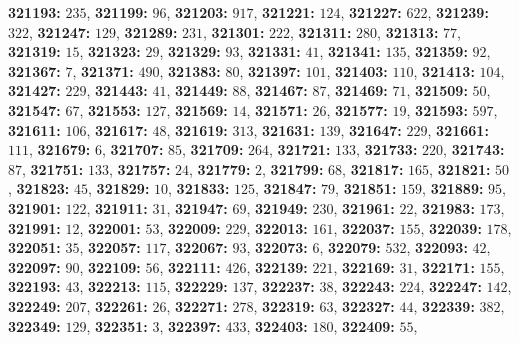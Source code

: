 \textsf{\bfseries 321193:} $235$, \textsf{\bfseries 321199:} $96$, \textsf{\bfseries 321203:} $917$, \textsf{\bfseries 321221:} $124$, \textsf{\bfseries 321227:} $622$, \textsf{\bfseries 321239:} $322$, \textsf{\bfseries 321247:} $129$, \textsf{\bfseries 321289:} $231$, \textsf{\bfseries 321301:} $222$, \textsf{\bfseries 321311:} $280$, \textsf{\bfseries 321313:} $77$, \textsf{\bfseries 321319:} $15$, \textsf{\bfseries 321323:} $29$, \textsf{\bfseries 321329:} $93$, \textsf{\bfseries 321331:} $41$, \textsf{\bfseries 321341:} $135$, \textsf{\bfseries 321359:} $92$, \textsf{\bfseries 321367:} $7$, \textsf{\bfseries 321371:} $490$, \textsf{\bfseries 321383:} $80$, \textsf{\bfseries 321397:} $101$, \textsf{\bfseries 321403:} $110$, \textsf{\bfseries 321413:} $104$, \textsf{\bfseries 321427:} $229$, \textsf{\bfseries 321443:} $41$, \textsf{\bfseries 321449:} $88$, \textsf{\bfseries 321467:} $87$, \textsf{\bfseries 321469:} $71$, \textsf{\bfseries 321509:} $50$, \textsf{\bfseries 321547:} $67$, \textsf{\bfseries 321553:} $127$, \textsf{\bfseries 321569:} $14$, \textsf{\bfseries 321571:} $26$, \textsf{\bfseries 321577:} $19$, \textsf{\bfseries 321593:} $597$, \textsf{\bfseries 321611:} $106$, \textsf{\bfseries 321617:} $48$, \textsf{\bfseries 321619:} $313$, \textsf{\bfseries 321631:} $139$, \textsf{\bfseries 321647:} $229$, \textsf{\bfseries 321661:} $111$, \textsf{\bfseries 321679:} $6$, \textsf{\bfseries 321707:} $85$, \textsf{\bfseries 321709:} $264$, \textsf{\bfseries 321721:} $133$, \textsf{\bfseries 321733:} $220$, \textsf{\bfseries 321743:} $87$, \textsf{\bfseries 321751:} $133$, \textsf{\bfseries 321757:} $24$, \textsf{\bfseries 321779:} $2$, \textsf{\bfseries 321799:} $68$, \textsf{\bfseries 321817:} $165$, \textsf{\bfseries 321821:} $50$, \textsf{\bfseries 321823:} $45$, \textsf{\bfseries 321829:} $10$, \textsf{\bfseries 321833:} $125$, \textsf{\bfseries 321847:} $79$, \textsf{\bfseries 321851:} $159$, \textsf{\bfseries 321889:} $95$, \textsf{\bfseries 321901:} $122$, \textsf{\bfseries 321911:} $31$, \textsf{\bfseries 321947:} $69$, \textsf{\bfseries 321949:} $230$, \textsf{\bfseries 321961:} $22$, \textsf{\bfseries 321983:} $173$, \textsf{\bfseries 321991:} $12$, \textsf{\bfseries 322001:} $53$, \textsf{\bfseries 322009:} $229$, \textsf{\bfseries 322013:} $161$, \textsf{\bfseries 322037:} $155$, \textsf{\bfseries 322039:} $178$, \textsf{\bfseries 322051:} $35$, \textsf{\bfseries 322057:} $117$, \textsf{\bfseries 322067:} $93$, \textsf{\bfseries 322073:} $6$, \textsf{\bfseries 322079:} $532$, \textsf{\bfseries 322093:} $42$, \textsf{\bfseries 322097:} $90$, \textsf{\bfseries 322109:} $56$, \textsf{\bfseries 322111:} $426$, \textsf{\bfseries 322139:} $221$, \textsf{\bfseries 322169:} $31$, \textsf{\bfseries 322171:} $155$, \textsf{\bfseries 322193:} $43$, \textsf{\bfseries 322213:} $115$, \textsf{\bfseries 322229:} $137$, \textsf{\bfseries 322237:} $38$, \textsf{\bfseries 322243:} $224$, \textsf{\bfseries 322247:} $142$, \textsf{\bfseries 322249:} $207$, \textsf{\bfseries 322261:} $26$, \textsf{\bfseries 322271:} $278$, \textsf{\bfseries 322319:} $63$, \textsf{\bfseries 322327:} $44$, \textsf{\bfseries 322339:} $382$, \textsf{\bfseries 322349:} $129$, \textsf{\bfseries 322351:} $3$, \textsf{\bfseries 322397:} $433$, \textsf{\bfseries 322403:} $180$, \textsf{\bfseries 322409:} $55$, 
